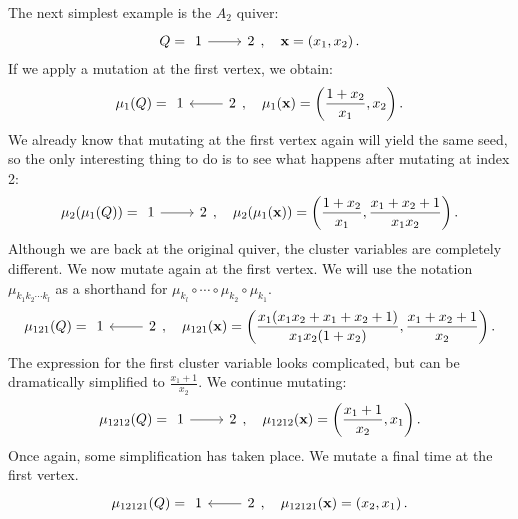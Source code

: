\begin{example}\label{exmp:A2_quiver}
	The next simplest example is the $A_2$ quiver:
	\begin{equation*}
		Q = \begin{tikzcd}
			1 \rar &2
		\end{tikzcd},
		\quad \bx = \left(x_1, x_2\right).
	\end{equation*}
	If we apply a mutation at the first vertex, we obtain:
	\begin{equation*}
		\mu_1(Q) = \begin{tikzcd}
			1 & \lar 2
		\end{tikzcd},
		\quad \mu_1(\bx) = \left(\frac{1+x_2}{x_1}, x_2\right).
	\end{equation*}
	We already know that mutating at the first vertex again will yield the same seed, so
	the only interesting thing to do is to see what happens after mutating at index 2:
	\begin{equation*}
		\mu_2(\mu_1(Q)) = \begin{tikzcd}
			1 \rar & 2
		\end{tikzcd},
		\quad  \mu_2(\mu_1(\bx)) = \left(\frac{1+x_2}{x_1}, \frac{x_1 + x_2 + 1}{x_1 x_2}\right).
	\end{equation*}
	Although we are back at the original quiver, the cluster variables are completely
	different. We now mutate again at the first vertex. We will use the notation
	$\mu_{k_1k_2\cdots k_l}$ as a shorthand for $\mu_{k_l} \circ \cdots \circ \mu_{k_2}
		\circ \mu_{k_1}$.
	\begin{equation*}
		\mu_{121}(Q) = \begin{tikzcd}
			1 &\lar 2
		\end{tikzcd},
		\quad  \mu_{121}(\bx) = \left(\frac{x_1(x_1 x_2 + x_1 + x_2 + 1)}{x_1x_2(1+x_2)}, \frac{x_1 + x_2 + 1}{x_2}\right).
	\end{equation*}
	The expression for the first cluster variable looks complicated, but can be
	dramatically simplified to $\frac{x_1 + 1}{x_2}$. We continue mutating:
	\begin{equation*}
		\mu_{1212}(Q) = \begin{tikzcd}
			1 \rar& 2
		\end{tikzcd},
		\quad  \mu_{1212}(\bx) = \left(\frac{x_1 + 1}{x_2}, x_1\right).
	\end{equation*}
	Once again, some simplification has taken place. We mutate a final time at the first
	vertex.
	\begin{equation*}
		\mu_{12121}(Q) = \begin{tikzcd}
			1 &\lar 2
		\end{tikzcd},
		\quad  \mu_{12121}(\bx) = \left(x_2, x_1\right).
	\end{equation*}


\end{example}
